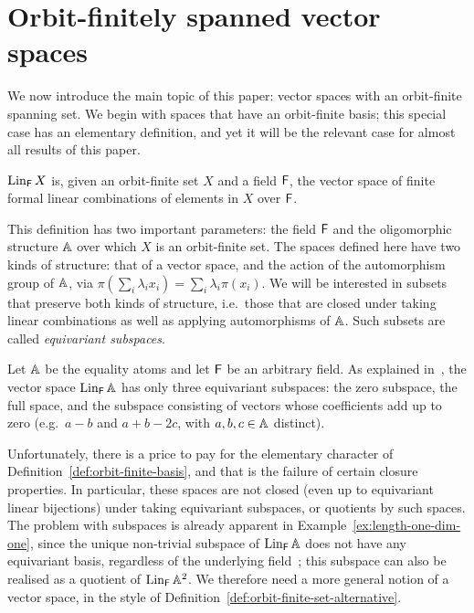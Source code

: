 \section{Orbit-finitely spanned vector spaces}\label{sec:spaces}
We now introduce the main topic of this paper: vector spaces with an orbit-finite spanning set. 
We begin with spaces that have an orbit-finite basis; 
this special case has an elementary definition, and yet it will be the relevant case for almost all results of this paper. 

\begin{definition}\label{def:orbit-finite-basis}
    $\operatorname{Lin}_{\mathsf{F}}{X}$ is, given an orbit-finite set $X$ and a field $\mathsf{F}$, the vector space of finite formal linear combinations of elements in $X$ over $\mathsf{F}$.
\end{definition}

This definition has two important parameters: the field $\mathsf{F}$ and the oligomorphic structure $\mathbb{A}$ over which $X$ is an orbit-finite set.
The spaces defined here have two kinds of structure: that of a vector space, and the action of the automorphism group of $\mathbb{A}$, via $\pi(\sum_i \lambda_i x_i) = \sum_i \lambda_i \pi(x_i)$. 
We will be interested in subsets that preserve both kinds of structure, 
i.e.~those that are closed under taking linear combinations as well as applying automorphisms of $\mathbb{A}$. 
Such subsets are called \emph{equivariant subspaces}. 


\begin{example}\label{ex:length-one-dim-one}
    Let $\mathbb{A}$ be the equality atoms and let $\mathsf{F}$ be an arbitrary field. 
    As explained in~\cite[Ex.~4.2]{BFKM24}, the vector space $\operatorname{Lin}_{\mathsf{F}} \mathbb{A}$ has only three equivariant subspaces: 
    the zero subspace, the full space, and the subspace consisting of vectors whose coefficients add up to zero 
    (e.g.~$a - b$ and $a + b - 2 c$, with $a, b, c \in \mathbb{A}$ distinct). 
\lipicsEnd\end{example}

 Unfortunately, there is a price to pay for the elementary character of Definition~\ref{def:orbit-finite-basis}, 
 and that is the failure of certain closure properties. 
 In particular, these spaces are not closed (even up to equivariant linear bijections) under taking equivariant subspaces, or quotients by such spaces. 
 The problem with subspaces is already apparent in Example~\ref{ex:length-one-dim-one}, since the unique non-trivial subspace of $\operatorname{Lin}_{\mathsf{F}} \mathbb{A}$ does not have any equivariant basis, regardless of the underlying field~\cite[Ex.~6.1]{BFKM24}; 
 this subspace can also be realised as a quotient of $\operatorname{Lin}_{\mathsf{F}} \mathbb{A}^2$.
We therefore need a more general notion of a vector space, in the style of Definition~\ref{def:orbit-finite-set-alternative}.

